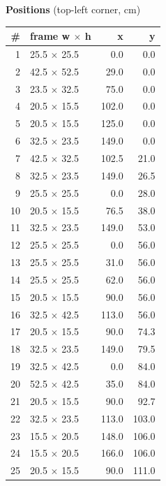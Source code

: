 \documentclass[a4paper,landscape,10pt]{article}
\begin{document}
\begin{minipage}[t]{0.25\textwidth}
\vspace{8pt}
{\bfseries Positions} (top-left corner, cm)\\[2pt]
\tiny
\begin{tabular}{@{}r l r r@{}}
\toprule
\# & frame w $\times$ h & x & y \\
\midrule
1 & 25.5 $\times$ 25.5 & 0.0 & 0.0 \\
2 & 42.5 $\times$ 52.5 & 29.0 & 0.0 \\
3 & 23.5 $\times$ 32.5 & 75.0 & 0.0 \\
4 & 20.5 $\times$ 15.5 & 102.0 & 0.0 \\
5 & 20.5 $\times$ 15.5 & 125.0 & 0.0 \\
6 & 32.5 $\times$ 23.5 & 149.0 & 0.0 \\
7 & 42.5 $\times$ 32.5 & 102.5 & 21.0 \\
8 & 32.5 $\times$ 23.5 & 149.0 & 26.5 \\
9 & 25.5 $\times$ 25.5 & 0.0 & 28.0 \\
10 & 20.5 $\times$ 15.5 & 76.5 & 38.0 \\
11 & 32.5 $\times$ 23.5 & 149.0 & 53.0 \\
12 & 25.5 $\times$ 25.5 & 0.0 & 56.0 \\
13 & 25.5 $\times$ 25.5 & 31.0 & 56.0 \\
14 & 25.5 $\times$ 25.5 & 62.0 & 56.0 \\
15 & 20.5 $\times$ 15.5 & 90.0 & 56.0 \\
16 & 32.5 $\times$ 42.5 & 113.0 & 56.0 \\
17 & 20.5 $\times$ 15.5 & 90.0 & 74.3 \\
18 & 32.5 $\times$ 23.5 & 149.0 & 79.5 \\
19 & 32.5 $\times$ 42.5 & 0.0 & 84.0 \\
20 & 52.5 $\times$ 42.5 & 35.0 & 84.0 \\
21 & 20.5 $\times$ 15.5 & 90.0 & 92.7 \\
22 & 32.5 $\times$ 23.5 & 113.0 & 103.0 \\
23 & 15.5 $\times$ 20.5 & 148.0 & 106.0 \\
24 & 15.5 $\times$ 20.5 & 166.0 & 106.0 \\
25 & 20.5 $\times$ 15.5 & 90.0 & 111.0 \\
\bottomrule
\end{tabular}
\end{minipage}
\clearpage
\end{document}
